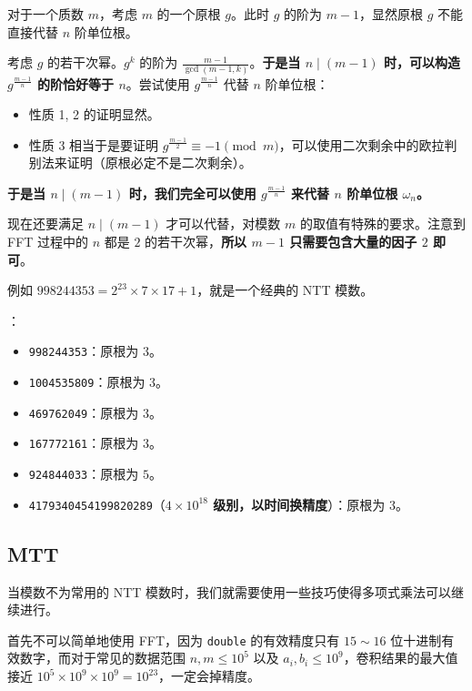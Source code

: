 对于一个质数 $m$，考虑 $m$ 的一个原根 $g$。此时 $g$ 的阶为 $m - 1$，显然原根 $g$ 不能直接代替 $n$ 阶单位根。

考虑 $g$ 的若干次幂。$g^k$ 的阶为 $\frac{m - 1}{\gcd(m - 1, k)}$。\textbf{于是当 $n \mid (m - 1)$ 时，可以构造 $g^{\frac{m - 1}{n}}$ 的阶恰好等于 $n$}。尝试使用 $g^{\frac{m - 1}{n}}$ 代替 $n$ 阶单位根：
\begin{itemize}
    \item 性质 1, 2 的证明显然。
    \item 性质 3 相当于是要证明 $g^{\frac{m - 1}{2}} \equiv -1 \pmod m$，可以使用二次剩余中的欧拉判别法来证明（原根必定不是二次剩余）。
\end{itemize}

\textbf{于是当 $n \mid (m - 1)$ 时，我们完全可以使用 $g^{\frac{m - 1}{n}}$ 来代替 $n$ 阶单位根 $\omega_n$。}

现在还要满足 $n \mid (m - 1)$ 才可以代替，对模数 $m$ 的取值有特殊的要求。注意到 FFT 过程中的 $n$ 都是 $2$ 的若干次幂，\textbf{所以 $m - 1$ 只需要包含大量的因子 $2$ 即可}。

例如 $998244353 = 2^{23} \times 7 \times 17 + 1$，就是一个经典的 NTT 模数。

：

\begin{itemize}
    \item \texttt{998244353}：原根为 $3$。
    \item \texttt{1004535809}：原根为 $3$。
    \item \texttt{469762049}：原根为 $3$。
    \item \texttt{167772161}：原根为 $3$。
    \item \texttt{924844033}：原根为 $5$。
    \item \texttt{4179340454199820289}（\textbf{$4 \times 10^{18}$ 级别，以时间换精度}）：原根为 $3$。
\end{itemize}


\subsection{MTT}

当模数不为常用的 NTT 模数时，我们就需要使用一些技巧使得多项式乘法可以继续进行。

首先不可以简单地使用 FFT，因为 \texttt{double} 的有效精度只有 $15\sim 16$ 位十进制有效数字，而对于常见的数据范围 $n, m \leq 10^5$ 以及 $a_i, b_i \leq 10^9$，卷积结果的最大值接近 $10^5 \times 10^9 \times 10^9 = 10^{23}$，一定会掉精度。

